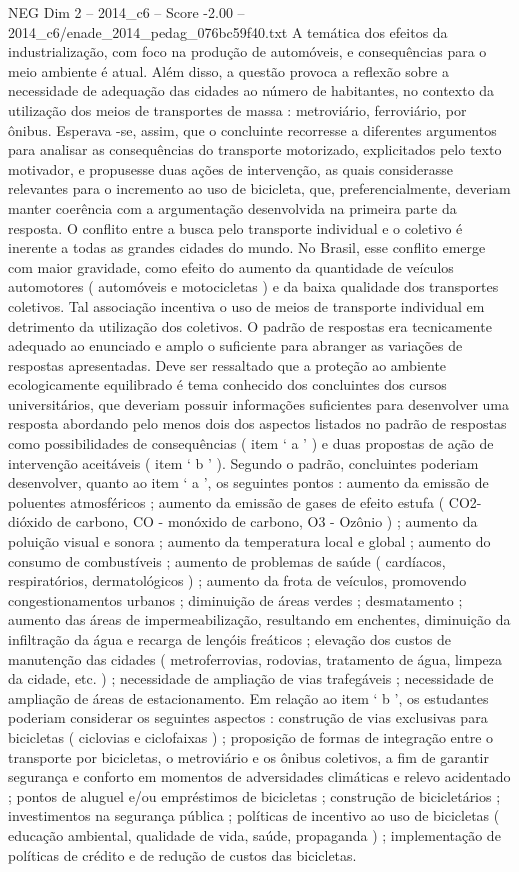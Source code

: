 \begin{textsample}{NEG Dim 2 – 2014\_c6 – Score -2.00 – 2014\_c6/enade\_2014\_pedag\_076bc59f40.txt}
A temática dos efeitos da industrialização, com foco na produção de automóveis, e consequências para o meio ambiente é atual.
Além disso, a questão provoca a reflexão sobre a necessidade de adequação das cidades ao número de habitantes, no contexto da utilização dos meios de transportes de massa : metroviário, ferroviário, por ônibus.
Esperava -se, assim, que o concluinte recorresse a diferentes argumentos para analisar as consequências do transporte motorizado, explicitados pelo texto motivador, e propusesse duas ações de intervenção, as quais considerasse relevantes para o incremento ao uso de bicicleta, que, preferencialmente, deveriam manter coerência com a argumentação desenvolvida na primeira parte da resposta.
O conflito entre a busca pelo transporte individual e o coletivo é inerente a todas as grandes cidades do mundo.
No Brasil, esse conflito emerge com maior gravidade, como efeito do aumento da quantidade de veículos automotores ( automóveis e motocicletas ) e da baixa qualidade dos transportes coletivos.
Tal associação incentiva o uso de meios de transporte individual em detrimento da utilização dos coletivos.
O padrão de respostas era tecnicamente adequado ao enunciado e amplo o suficiente para abranger as variações de respostas apresentadas.
Deve ser ressaltado que a proteção ao ambiente ecologicamente equilibrado é tema conhecido dos concluintes dos cursos universitários, que deveriam possuir informações suficientes para desenvolver uma resposta abordando pelo menos dois dos aspectos listados no padrão de respostas como possibilidades de consequências ( item ‘ a ’ ) e duas propostas de ação de intervenção aceitáveis ( item ‘ b ’ ).
Segundo o padrão, concluintes poderiam desenvolver, quanto ao item ‘ a ’, os seguintes pontos : aumento da emissão de poluentes atmosféricos ; aumento da emissão de gases de efeito estufa ( CO2- dióxido de carbono, CO - monóxido de carbono, O3 - Ozônio ) ; aumento da poluição visual e sonora ; aumento da temperatura local e global ; aumento do consumo de combustíveis ; aumento de problemas de saúde ( cardíacos, respiratórios, dermatológicos ) ; aumento da frota de veículos, promovendo congestionamentos urbanos ; diminuição de áreas verdes ; desmatamento ; aumento das áreas de impermeabilização, resultando em enchentes, diminuição da infiltração da água e recarga de lençóis freáticos ; elevação dos custos de manutenção das cidades ( metroferrovias, rodovias, tratamento de água, limpeza da cidade, etc. ) ; necessidade de ampliação de vias trafegáveis ; necessidade de ampliação de áreas de estacionamento.
Em relação ao item ‘ b ’, os estudantes poderiam considerar os seguintes aspectos : construção de vias exclusivas para bicicletas ( ciclovias e ciclofaixas ) ; proposição de formas de integração entre o transporte por bicicletas, o metroviário e os ônibus coletivos, a fim de garantir segurança e conforto em momentos de adversidades climáticas e relevo acidentado ; pontos de aluguel e/ou empréstimos de bicicletas ; construção de bicicletários ; investimentos na segurança pública ; políticas de incentivo ao uso de bicicletas ( educação ambiental, qualidade de vida, saúde, propaganda ) ; implementação de políticas de crédito e de redução de custos das bicicletas.

\end{textsample}
